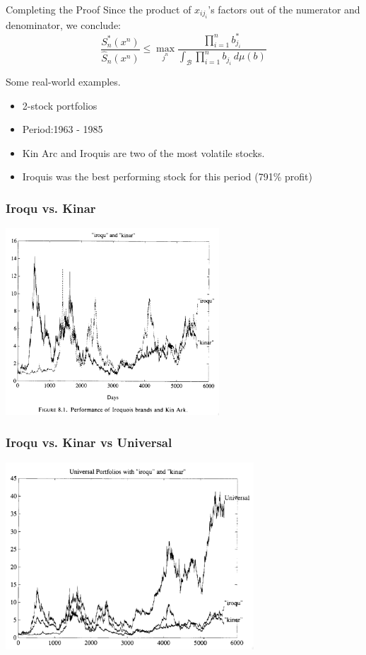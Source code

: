 \documentclass{beamer}
\begin{document}
\begin{small}
\begin{frame}{Completing the Proof}
    Since the product of \( x_{ij_i} \)'s factors out of the numerator and denominator, we conclude:
    \[
        \frac{S_n^*(x^n)}{\hat{S}_n(x^n)}
        \leq \max\limits_{j^n} \frac{\prod\limits_{i=1}^{n} b^*_{j_i}}
        {\int_{\mathcal{B}} \prod\limits_{i=1}^{n} b_{j_i} \, d\mu(b)}
    \]
\end{frame}

\begin{frame}{Some real-world examples.}
    \begin{itemize}
    \item 2-stock portfolios
    \item Period:1963 - 1985
    \item Kin Arc and Iroquis are two of the most volatile stocks.
    \item Iroquis was the best performing stock for this period (791\% profit)
    \end{itemize}
\end{frame}


\begin{frame}
\frametitle{Iroqu vs. Kinar}
\includegraphics[height=7cm]{figures/Cursor_and_Universal_Portfolios_pdf-3.png}
\end{frame}

\begin{frame}
\frametitle{Iroqu vs. Kinar vs Universal}
\includegraphics[height=7cm]{figures/Cursor_and_Universal_Portfolios_pdf-2.png}
\end{frame}


\end{small}
\end{document}
